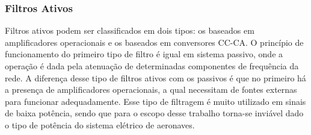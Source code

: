\subsubsection{Filtros Ativos}

Filtros ativos podem ser classificados em dois tipos: os baseados em amplificadores operacionais e os baseados em conversores CC-CA. O princípio de funcionamento do primeiro tipo de filtro é igual em sistema passivo, onde a operação é dada pela atenuação de determinadas componentes de frequência da rede. A diferença desse tipo de filtros ativos com os passivos é que no primeiro há a presença de amplificadores operacionais, a qual necessitam de fontes externas para funcionar adequadamente. Esse tipo de filtragem é muito utilizado em sinais de baixa potência, sendo que para o escopo desse trabalho torna-se inviável dado o tipo de potência do sistema elétrico de aeronaves. 


